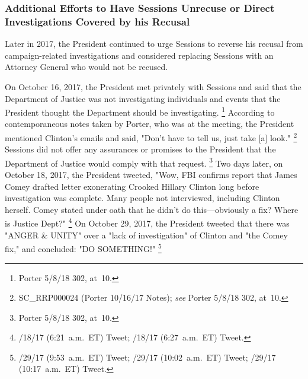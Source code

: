 {\subsubsection{Additional Efforts to Have Sessions Unrecuse or Direct Investigations Covered by his Recusal}

Later in 2017, the President continued to urge Sessions to reverse his recusal from campaign-related investigations and considered replacing Sessions with an Attorney General who would not be recused.

On October 16, 2017, the President met privately with Sessions and said that the Department of Justice was not investigating individuals and events that the President thought the Department should be investigating.%
\footnote{Porter 5/8/18 302, at~10.}
According to contemporaneous notes taken by Porter, who was at the meeting, the President mentioned Clinton's emails and said, "Don't have to tell us, just take [a] look."%
\footnote{SC\_RRP000024 (Porter 10/16/17 Notes);
\textit{see} Porter 5/8/18 302, at~10.}
Sessions did not offer any assurances or promises to the President that the Department of Justice would comply with that request.%
\footnote{Porter 5/8/18 302, at~10.}
Two days later, on October 18, 2017, the President tweeted, "Wow, FBI confirms report that James Comey drafted letter exonerating Crooked Hillary Clinton long before investigation was complete.
Many people not interviewed, including Clinton herself.
Comey stated under oath that he didn't do this---obviously a fix?
Where is Justice Dept?"%
\footnote{/18/17 (6:21~a.m.~ET) Tweet;
/18/17 (6:27~a.m.~ET) Tweet.}
On October 29, 2017, the President tweeted that there was "ANGER \& UNITY" over a "lack of investigation" of Clinton and "the Comey fix," and concluded: "DO SOMETHING!"%
\footnote{/29/17 (9:53~a.m.~ET) Tweet;
/29/17 (10:02~a.m.~ET) Tweet;
/29/17 (10:17~a.m.~ET) Tweet.}

}
